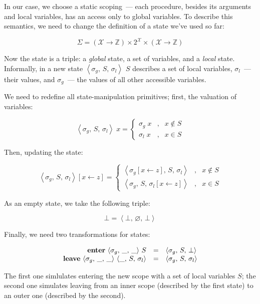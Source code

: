 \documentclass{article}
\newcommand{\inbr}[1]{\left<{#1}\right>}
\renewcommand{\emptyset}{\varnothing}
\theoremstyle{definition}
\begin{document}
In our case, we choose a static scoping~--- each procedure, besides its arguments and local variables, has an access
only to global variables.  To describe this semantics, we need to change the definition of a state we've used so far:

\[
\Sigma = (\mathscr X \to \mathbb Z) \times 2^{\mathscr X} \times (\mathscr X \to \mathbb Z)
\]

Now the state is a triple: a \emph{global} state, a set of variables, and a \emph{local} state. Informally, in a new
state $\inbr{\sigma_g,\,S,\,\sigma_l}$ $S$ describes a set of local variables, $\sigma_l$~--- their values, and $\sigma_g$~---
the values of all other accessible variables.

We need to redefine all state-manipulation primitives; first, the valuation of variables:

\[
\inbr{\sigma_g,\,S,\,\sigma_l}\;x=
  \left\{\begin{array}{rcl}
            \sigma_g\;x & , & x\not\in S\\
            \sigma_l\;x & , & x \in S
         \end{array}
  \right.
\]

Then, updating the state:

\[
\inbr{\sigma_g,\,S,\,\sigma_l}[x\gets z] =
  \left\{\begin{array}{rcl}
            \inbr{\sigma_g[x\gets z],\,S,\,\sigma_l} & , & x\not\in S\\
            \inbr{\sigma_g,\,S,\,\sigma_l[x\gets z]} & , & x \in S
         \end{array}
  \right.
\]

As an empty state, we take the following triple:

\[
\bot=\inbr{\bot,\,\emptyset,\,\bot}
\]

Finally, we need two transformations for states:

\[
\begin{array}{rcl}
  \mbox{\textbf{enter}}\,\inbr{\sigma_g,\,\_,\,\_}\,S & = & \inbr{\sigma_g,\,S,\,\bot}\\
  \mbox{\textbf{leave}}\,\inbr{\sigma_g,\,\_,\,\_}\,\inbr{\_,\,S,\,\sigma_l}& = & \inbr{\sigma_g,\,S,\,\sigma_l}
\end{array}
\]

The first one simlulates entering the new scope with a set of local variables $S$; the second one simulates leaving
from an inner scope (described by the first state) to an outer one (described by the second).
\end{document}

